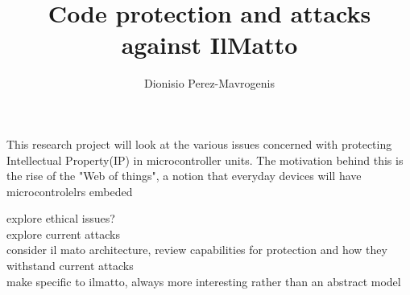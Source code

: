 \documentclass[12pt,a4paper,onecolumn]{article}
\author{Dionisio Perez-Mavrogenis}
\title{Code protection and attacks against IlMatto}
\begin{document}
\maketitle
%   

This research project will look at the various issues concerned with protecting Intellectual Property(IP) in microcontroller units. The motivation behind this is the rise of the "Web of things", a notion that everyday devices will have microcontrolelrs embeded

explore ethical issues? \\
explore current attacks \\
consider il mato architecture, review capabilities for protection and how they withstand current attacks \\
make specific to ilmatto, always more interesting rather than an abstract model\\
\end{document}
